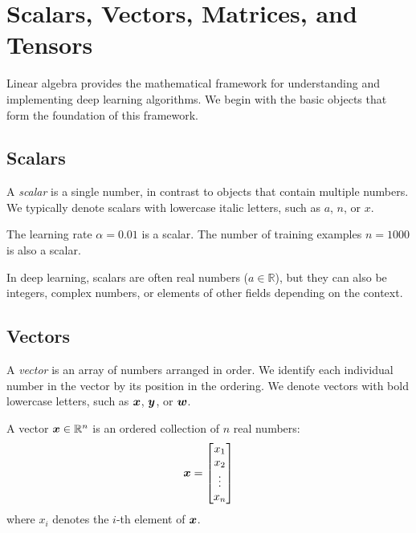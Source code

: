 
\section{Scalars, Vectors, Matrices, and Tensors }
\label{sec:scalars-vectors-matrices-tensors}

Linear algebra provides the mathematical framework for understanding and implementing deep learning algorithms. We begin with the basic objects that form the foundation of this framework.

\subsection{Scalars}

A \emph{scalar} is a single number, in contrast to objects that contain multiple numbers. We typically denote scalars with lowercase italic letters, such as $a$, $n$, or $x$.

\begin{example}
The learning rate $\alpha = 0.01$ is a scalar. The number of training examples $n = 1000$ is also a scalar.
\end{example}

In deep learning, scalars are often real numbers ($a \in \mathbb{R}$), but they can also be integers, complex numbers, or elements of other fields depending on the context.

\subsection{Vectors}

A \emph{vector} is an array of numbers arranged in order. We identify each individual number in the vector by its position in the ordering. We denote vectors with bold lowercase letters, such as $\boldsymbol{x}$, $\boldsymbol{y}$, or $\boldsymbol{w}$.

\begin{definition}[Vector]
A vector $\boldsymbol{x} \in \mathbb{R}^n$ is an ordered collection of $n$ real numbers:
\begin{equation}
    \boldsymbol{x} = \begin{bmatrix} x_1 \\ x_2 \\ \vdots \\ x_n \end{bmatrix}
\end{equation}
where $x_i$ denotes the $i$-th element of $\boldsymbol{x}$.
\end{definition}

